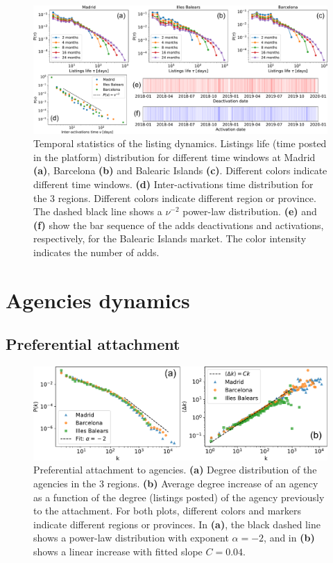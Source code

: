 \begin{figure}
    \label{fig:panel_time}
    \centering
    \includegraphics[width =\textwidth]{Figs/Idealista_dynamics/panel_time.pdf}
	\caption[Temporal statistics of the listing dynamics.]{Temporal statistics of the listing dynamics. Listings life (time posted in the platform) distribution for different time windows at Madrid \textbf{(a)}, Barcelona \textbf{(b)} and Balearic Islands \textbf{(c)}. Different colors indicate different time windows. \textbf{(d)} Inter-activations time distribution for the 3 regions. Different colors indicate different region or province. The dashed black line shows a $\nu^{-2}$ power-law distribution. \textbf{(e)} and \textbf{(f)} show the bar sequence of the adds deactivations and activations, respectively, for the Balearic Islands market. The color intensity indicates the number of adds.}
\end{figure}

\section{Agencies dynamics}

\subsection{Preferential attachment}

\begin{figure}
    \label{fig:panel_degree}
    \centering
    \includegraphics[width =\textwidth]{Figs/Idealista_dynamics/panel_degree.pdf}
	\caption[Preferential attachment to agencies.]{Preferential attachment to agencies. \textbf{(a)} Degree distribution of the agencies in the 3 regions. \textbf{(b)} Average degree increase of an agency as a function of the degree (listings posted) of the agency previously to the attachment. For both plots, different colors and markers indicate different regions or provinces. In \textbf{(a)}, the black dashed line shows a power-law distribution with exponent $\alpha  =-2$, and in \textbf{(b)} shows a linear increase with fitted slope $C = 0.04$.}
\end{figure}

